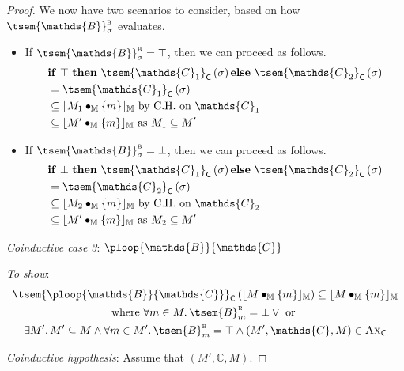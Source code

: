 {\begin{proof}
We now have two scenarios to consider, based on how $\tsem{\mathds{B}}_\sigma^\textsc{b}$ evaluates.
\begin{itemize}
	\item If $\tsem{\mathds{B}}_\sigma^\textsc{b} = \top$, then we can proceed as follows.
		\begin{align*}			
			& \mathbf{if}\ \top\ \mathbf{then}\ \tsem{\mathds{C}_1}_\mathsf{C}\left( \sigma \right) \mathbf{else}\ \tsem{\mathds{C}_2}_\mathsf{C}\left( \sigma \right) \\
				&=
			\tsem{\mathds{C}_1}_\mathsf{C} \left( \sigma \right) \\
				&
			\subseteq \lfloor M_1 \bullet_\mathbb{M} \{m\} \rfloor_\mathbb{M} \text{ by C.H. on } \mathds{C}_1 \\
				&
			\subseteq \lfloor M' \bullet_\mathbb{M} \{m\} \rfloor_\mathbb{M} \text{ as } M_1 \subseteq M'
		\end{align*}
	\item If $\tsem{\mathds{B}}_\sigma^\textsc{b} = \bot$, then we can proceed as follows.
		\begin{align*}			
			& \mathbf{if}\ \bot\ \mathbf{then}\ \tsem{\mathds{C}_1}_\mathsf{C}\left( \sigma \right) \mathbf{else}\ \tsem{\mathds{C}_2}_\mathsf{C}\left( \sigma \right) \\
			&=
			\tsem{\mathds{C}_2}_\mathsf{C} \left( \sigma \right) \\
			&
			\subseteq \lfloor M_2 \bullet_\mathbb{M} \{m\} \rfloor_\mathbb{M} \text{ by C.H. on } \mathds{C}_2 \\
			&
			\subseteq \lfloor M' \bullet_\mathbb{M} \{m\} \rfloor_\mathbb{M} \text{ as } M_2 \subseteq M'
		\end{align*}
\end{itemize}
\indline
\textit{Coinductive case 3}: $\ploop{\mathds{B}}{\mathds{C}}$

\textit{To show}:
\begin{gather*}
	\tsem{\ploop{\mathds{B}}{\mathds{C}}}_\mathsf{C} \left( \lfloor M \bullet_\mathbb{M} \{m\} \rfloor_\mathbb{M} \right) \subseteq \lfloor M \bullet_\mathbb{M} \{m\} \rfloor_\mathbb{M}
	\\
	\text{where } \forall m \in M \ldotp \tsem{B}^\textsc{b}_m = \bot \lor \text{ or } \\
	\exists M' \ldotp M' \subseteq M \land  \forall m \in M' \ldotp \tsem{B}^\textsc{b}_m = \top \land (M', \mathds{C}, M) \in \textsc{Ax}_\mathsf{C}
\end{gather*}

\textit{Coinductive hypothesis}: Assume that $(M', \mathds{C}, M)$.


\end{proof}}
